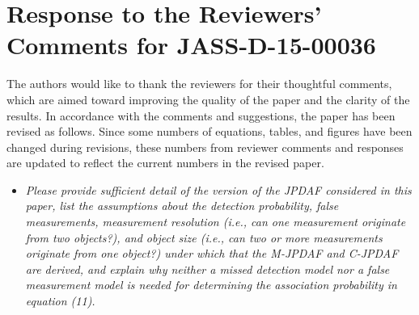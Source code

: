 \documentclass[11pt]{article}
\begin{document}

\section*{Response to the Reviewers' Comments for JASS-D-15-00036}

The authors would like to thank the reviewers for their thoughtful comments, which are aimed toward improving the quality of the paper and the clarity of the results. In accordance with the comments and suggestions, the paper has been revised as follows.
Since some numbers of equations, tables, and figures have been changed during revisions, these numbers from reviewer comments and responses are updated to reflect the current numbers in the revised paper.

\setlength{\leftmargini}{0pt}
\begin{itemize}\setlength{\itemsep}{2\parsep}

\subsection*{Associate Editor Comments for the Author}


\item {\itshape Please provide sufficient detail of the version of the JPDAF considered in this paper, list the assumptions about the detection probability, false measurements, measurement resolution (i.e., can one measurement originate from two objects?), and object size (i.e., can two or more measurements originate from one object?) under which that the M-JPDAF and C-JPDAF are derived, and explain why neither a missed detection model nor a false measurement model is needed for determining the association probability in equation (11).}


\end{itemize}
\end{document}
